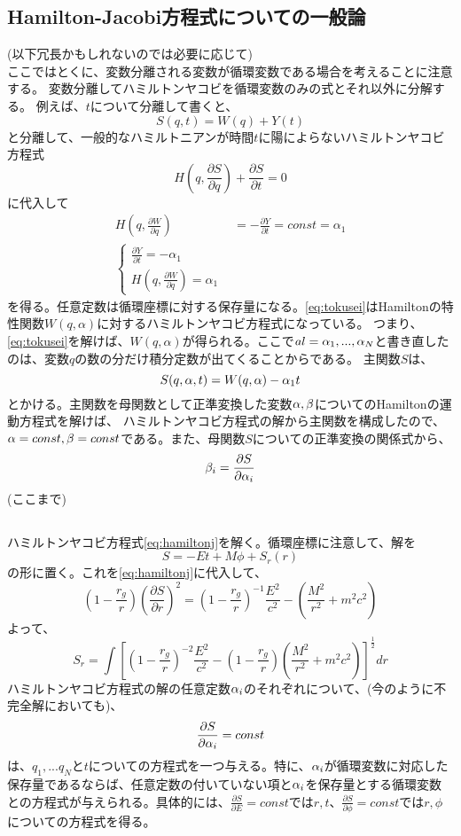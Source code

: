 \documentclass{jsarticle}
\newcommand{\pder}[2][]{\frac{\partial#1}{\partial#2}}
\newcommand{\half}{\frac{1}{2}}
\newcommand{\beq}{\begin{equation}}
\newcommand{\eeq}{\end{equation}}
\begin{document}
\subsection{Hamilton-Jacobi方程式についての一般論}
(以下冗長かもしれないのでは必要に応じて)\\
ここではとくに、変数分離される変数が循環変数である場合を考えることに注意する。
変数分離してハミルトンヤコビを循環変数のみの式とそれ以外に分解する。
例えば、$t$について分離して書くと、
\beq
S(q, t) = W(q) + Y(t)
\eeq
と分離して、一般的なハミルトニアンが時間$t$に陽によらないハミルトンヤコビ方程式
\beq
    H(q,\pder[S]{q}) + \pder[S]{t} = 0
\eeq
に代入して
\begin{align}
    H(q, \pder[W]{q}) &= - \pder[Y]{t} = const =\alpha_1\\
    \left\{
\begin{array}{l}
    \pder[Y]{t} = -\alpha_1\\
    H(q, \pder[W]{q}) = \alpha_1\label{eq:tokusei}
\end{array}
\right.
\end{align}
を得る。任意定数は循環座標に対する保存量になる。\eqref{eq:tokusei}はHamiltonの特性関数$W(q,\alpha)$に対するハミルトンヤコビ方程式になっている。
つまり、\eqref{eq:tokusei}を解けば、$W(q,\alpha)$が得られる。ここで$al = {\alpha_1, ... ,\alpha_N}$と書き直したのは、変数$q$の数の分だけ積分定数が出てくることからである。
主関数$S$は、
\beq
S(q, \alpha, t) = W(q, \al) - \al_1 t
\eeq
とかける。主関数を母関数として正準変換した変数$\alpha, \beta$についてのHamiltonの運動方程式を解けば、
ハミルトンヤコビ方程式の解から主関数を構成したので、$\alpha = const, \beta = const$である。また、母関数$S$についての正準変換の関係式から、
\beq
 \be_i = \pder[S]{\al_i}
\eeq
(ここまで)
\subsection{}
ハミルトンヤコビ方程式\eqref{eq:hamiltonj}を解く。循環座標に注意して、解を
\beq
    S = - Et + M \phi + S_r(r)
\eeq
の形に置く。これを\eqref{eq:hamiltonj}に代入して、
\beq
    (1 - \frac{r_g}{r})(\pder[S]{r})^2 = (1 - \frac{r_g}{r})^{-1} \frac{E^2}{c^2} - (\frac{M^2}{r^2} + m^2c^2)
\eeq
よって、
\beq
S_r = \int \left[(1 - \frac{r_g}{r})^{-2} \frac{E^2}{c^2} - (1 - \frac{r_g}{r})(\frac{M^2}{r^2} + m^2c^2)
 \right]^{\half}dr
\eeq
ハミルトンヤコビ方程式の解の任意定数$\alpha_i$のそれぞれについて、(今のように不完全解においても)、
\beq
    \pder[S]{\al_i} = const
\eeq
は、$q_1, ... q_N$と$t$についての方程式を一つ与える。特に、$\alpha_i$が循環変数に対応した保存量であるならば、任意定数の付いていない項と$\alpha_i$を保存量とする循環変数との方程式が与えられる。具体的には、$\pder[S]{E} = const$では$r, t$、$\pder[S]{\phi} = const$では$r, \phi$についての方程式を得る。
\end{document}
